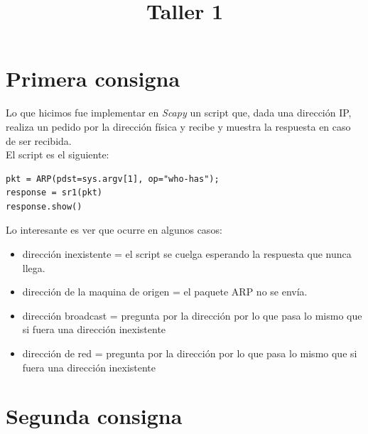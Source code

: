 \documentclass[a4paper]{article}
\title{Taller 1}
\begin{document}


\maketitle

\newpage

\tableofcontents


\newpage

\section{Primera consigna}

Lo que hicimos fue implementar en \textit{Scapy} un script que, dada una dirección IP, realiza un pedido por la dirección física y recibe y muestra la respuesta en caso de ser recibida. \\

El script es el siguiente:

\begin{verbatim}
pkt = ARP(pdst=sys.argv[1], op="who-has");
response = sr1(pkt)
response.show()
\end{verbatim}


Lo interesante es ver que ocurre en algunos casos:

\begin{itemize}
\item dirección inexistente = el script se cuelga esperando la respuesta que nunca llega. 
\item dirección de la maquina de origen = el paquete ARP no se envía.
\item dirección broadcast = pregunta por la dirección por lo que pasa lo mismo que si fuera una dirección inexistente 
\item dirección de red = pregunta por la dirección por lo que pasa lo mismo que si fuera una dirección inexistente 
\end{itemize}


\section{Segunda consigna}
\end{document}
